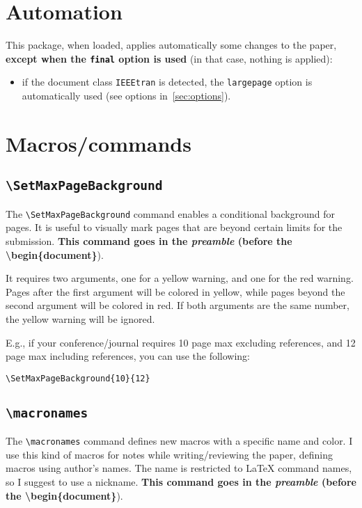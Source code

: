 \documentclass[a4paper]{article}
\newcommand\B[1]{\texttt{\textbackslash #1}}
\begin{document}
\section{Automation}
\label{sec:automation}

This package, when loaded, applies automatically some changes to the paper, \textbf{except when the \texttt{final} option is used} (in that case, nothing is applied):

\begin{itemize}
	\item if the document class \texttt{IEEEtran} is detected, the \texttt{largepage} option is automatically used (see options in~\autoref{sec:options}).
\end{itemize}


\section{Macros/commands}

\subsection{\B{SetMaxPageBackground}}

The \B{SetMaxPageBackground} command enables a conditional background for pages. It is useful to visually mark pages that are beyond certain limits for the submission. \textbf{This command goes in the \textit{preamble} (before the \textbackslash begin\{document\}}).

It requires two arguments, one for a yellow warning, and one for the red warning. Pages after the first argument will be colored in yellow, while pages beyond the second argument will be colored in red. If both arguments are the same number, the yellow warning will be ignored.

E.g., if your conference/journal requires 10 page max excluding references, and 12 page max including references, you can use the following:

\begin{verbatim}
\SetMaxPageBackground{10}{12}
\end{verbatim}

\subsection{\B{macronames}}

The \B{macronames} command defines new macros with a specific name and color. I use this kind of macros for notes while writing/reviewing the paper, defining macros using author's names. The name is restricted to LaTeX command names, so I suggest to use a nickname. \textbf{This command goes in the \textit{preamble} (before the \textbackslash begin\{document\}}).
\end{document}
